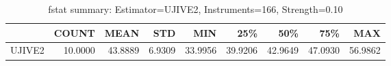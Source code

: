 \begin{table}[ht]
\centering
\caption{fstat summary: Estimator=UJIVE2, Instruments=166, Strength=0.10}
\begin{tabular}{lrrrrrrrr}
\toprule
 & COUNT & MEAN & STD & MIN & 25\% & 50\% & 75\% & MAX \\
\midrule
UJIVE2 & 10.0000 & 43.8889 & 6.9309 & 33.9956 & 39.9206 & 42.9649 & 47.0930 & 56.9862 \\
\bottomrule
\end{tabular}
\end{table}
